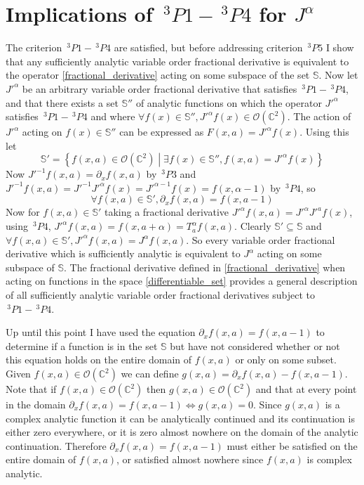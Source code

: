 \documentclass[%
 onecolumn,
 amsmath, amssymb, aps, pra, 10pt
]{revtex4-2}
\begin{document}
\section*{Implications of $\,^3P1 - \,^3P4$ for $J^{\alpha}$}
The criterion $\,^3P1 - \,^3P4$ are satisfied, but before addressing criterion $\,^3P5$ I show that any sufficiently analytic variable order fractional derivative is equivalent to the operator \eqref{fractional_derivative} acting on some subspace of the set $\mathbb{S}$. Now let $J'^{\alpha}$ be an arbitrary variable order fractional derivative that satisfies $\,^3P1 - \,^3P4$, and that there exists a set $\mathbb{S}''$ of analytic functions on which the operator $J'^{\alpha}$ satisfies $\,^3P1 - \,^3P4$ and where $\forall f(x) \in \mathbb{S}'', J'^{\alpha}f(x) \in \mathcal{O}(\mathbb{C}^2)$. The action of $J'^{\alpha}$ acting on $f(x) \in \mathbb{S}''$ can be expressed as $F(x, a) = J'^{\alpha} f(x)$. Using this let
$$\mathbb{S}' = \left\lbrace f(x, a) \in \mathcal{O}(\mathbb{C}^2) \middle| \exists f(x) \in \mathbb{S}'', f(x, a) = J'^{\alpha} f(x) \right\rbrace$$
Now $J'^{-1}f(x, a) = \partial_x f(x, a)$ by $\,^3P3$ and $J'^{-1} f(x, a) = J'^{-1}J'^{\alpha} f(x) = J'^{\alpha - 1} f(x) = f(x, \alpha - 1)$ by $\,^3P4$, so
$$\forall f(x, a) \in \mathbb{S}', \partial_x f(x, a) = f(x, a - 1)$$
Now for $f(x, a) \in \mathbb{S}'$ taking a fractional derivative $J'^{\alpha} f(x, a) = J'^{\alpha}J'^{a} f(x)$, using $\,^3P4$, $J'^{\alpha} f(x, a) = f(x, a + \alpha) = T_{a}^{\alpha} f(x, a)$. Clearly $\mathbb{S}' \subseteq \mathbb{S}$ and $\forall f(x, a) \in \mathbb{S}', J'^{\alpha} f(x, a) = J^{\alpha} f(x, a)$. So every variable order fractional derivative which is sufficiently analytic is equivalent to $J^{\alpha}$ acting on some subspace of $\mathbb{S}$. The fractional derivative defined in \eqref{fractional_derivative} when acting on functions in the space \eqref{differentiable_set} provides a general description of all sufficiently analytic variable order fractional derivatives subject to $\,^3P1 - \,^3P4$.

Up until this point I have used the equation $\partial_x f(x, a) = f(x, a - 1)$ to determine if a function is in the set $\mathbb{S}$ but have not considered whether or not this equation holds on the entire domain of $f(x, a)$ or only on some subset. Given $f(x, a) \in \mathcal{O}(\mathbb{C}^2)$ we can define $g(x, a) = \partial_x f(x, a) - f(x, a - 1)$. Note that if $f(x, a) \in \mathcal{O}(\mathbb{C}^2)$ then $g(x, a) \in \mathcal{O}(\mathbb{C}^2)$ and that at every point in the domain $\partial_x f(x, a) = f(x, a - 1) \iff g(x, a) = 0$. Since $g(x, a)$ is a complex analytic function it can be analytically continued and its continuation is either zero everywhere, or it is zero almost nowhere on the domain of the analytic continuation. Therefore $\partial_x f(x, a) = f(x, a - 1)$ must either be satisfied on the entire domain of $f(x, a)$, or satisfied almost nowhere since $f(x, a)$ is complex analytic.
\end{document}
